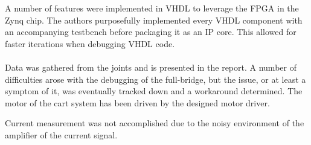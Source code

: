 A number of features were implemented in VHDL to leverage the FPGA in the Zynq chip.
The authors purposefully implemented every VHDL component with an accompanying testbench before packaging it as an IP core.
This allowed for faster iterations when debugging VHDL code.
\\~\\
Data was gathered from the joints and is presented in the report.
A number of difficulties arose with the debugging of the full-bridge, but the issue, or at least a symptom of it, was eventually tracked down and a workaround determined.
The motor of the cart system has been driven by the designed motor driver.

Current measurement was not accomplished due to the noisy environment of the amplifier of the current signal.